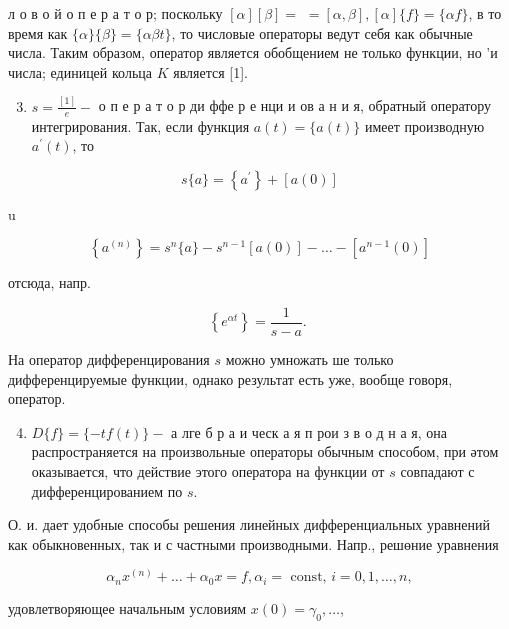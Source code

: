 \documentclass[10pt]{article}
\begin{document}
л о в о й о п е р а т о р; поскольку $[\alpha][\beta]=$ $=[\alpha, \beta],[\alpha]\{f\}=\{\alpha f\}$, в то время как $\{\alpha\}\{\beta\}=\{\alpha \beta t\}$, то числовые операторы ведут себя как обычные числа. Таким образом, оператор является обобщением не только функции, но 'и числа; единицей кольца $K$ является [1].



\begin{enumerate}

  \setcounter{enumi}{2}

  \item $s=\frac{[1]}{e}-$ о п е р а т о р ди ффе р е нци и ов а н и я, обратный оператору интегрирования. Так, если функция $a(t)=\{a(t)\}$ имеет производную $a^{\prime}(t)$, то

\end{enumerate}



\[

s\{a\}=\left\{a^{\prime}\right\}+[a(0)]

\]



u



\[

\left\{a^{(n)}\right\}=s^{n}\{a\}-s^{n-1}[a(0)]-\ldots-\left[a^{n-1}(0)\right]

\]



отсюда, напр.



\[

\left\{e^{\alpha t}\right\}=\frac{1}{s-a} \text {. }

\]



На оператор дифференцирования $s$ можно умножать ше только дифференцируемые функции, однако результат есть уже, вообще говоря, оператор.



\begin{enumerate}

  \setcounter{enumi}{3}

  \item $D\{f\}=\{-t f(t)\}-$ а лге б р а и ческ а я п рои з в о д н а я, она распространяется на произвольные операторы обычным способом, при әтом оказывается, что действие этого оператора на функции от $s$ совпадают с дифференцированием по $s$.

\end{enumerate}



О. и. дает удобные способы решения линейных дифференциальных уравнений как обыкновенных, так и с частными производными. Напр., решөние уравнения



\[

\alpha_{n} x^{(n)}+\ldots+\alpha_{0} x=f, \alpha_{i}=\text { const, } i=0,1, \ldots, n,

\]



удовлетворяющее начальным условиям $x(0)=\gamma_{0}, \ldots$,
\end{document}
